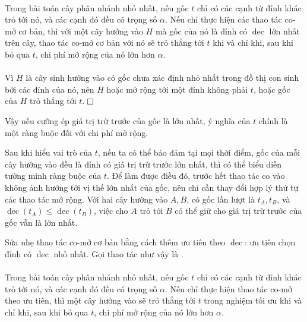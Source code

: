 \documentclass[11pt]{article}
\newcommand{\proofbox}{\ensuremath{\vcenter{\hrule height 0.45pt
  \hbox{\vrule width 0.45pt height 6pt\kern 6pt\vrule width 0.45pt}
  \hrule height 0.45pt}}}
\begin{document}
\paragraph{}
Trong bài toán cây phân nhánh nhỏ nhất, nếu gốc \(t\) chỉ có các cạnh từ đỉnh
khác trỏ tới nó, và các cạnh đó đều có trọng số \(\alpha\). Nếu chỉ thực hiện
các thao tác co-mở cơ bản, thì với một cây hướng vào \(H\) mà gốc của nó là
đỉnh có \(\operatorname{dec}\) lớn nhất trên cây, thao tác co-mở cơ bản với nó
sẽ trỏ thẳng tới \(t\) khi và chỉ khi, sau khi bỏ qua \(t\), chi phí mở rộng
của nó lớn hơn \(\alpha\).

\paragraph{}
Vì \(H\) là cây sinh hướng vào có gốc chưa xác định nhỏ nhất trong đồ thị con
sinh bởi các đỉnh của nó, nên \(H\) hoặc mở rộng tới một đỉnh không phải \(t\),
hoặc gốc của \(H\) trỏ thẳng tới \(t\). \proofbox

Vậy nếu cưỡng ép giá trị trừ trước của gốc là lớn nhất, ý nghĩa của \(t\) chính
là một ràng buộc đối với chi phí mở rộng.

Sau khi hiểu vai trò của \(t\), nếu ta có thể bảo đảm tại mọi thời điểm, gốc của
mỗi cây hướng vào đều là đỉnh có giá trị trừ trước lớn nhất, thì có thể biểu
diễn tường minh ràng buộc của \(t\). Để làm được điều đó, trước hết thao tác co
vào không ảnh hưởng tới vị thế lớn nhất của gốc, nên chỉ cần thay đổi hợp lý
thứ tự các thao tác mở rộng. Với hai cây hướng vào \(A,B\), có gốc lần lượt là
\(t_A,t_B\), và \(\operatorname{dec}(t_A)\le \operatorname{dec}(t_B)\), việc cho
\(A\) trỏ tới \(B\) có thể giữ cho giá trị trừ trước của gốc vẫn là lớn nhất.

Sửa nhẹ thao tác co-mở cơ bản bằng cách thêm ưu tiên theo \(\operatorname{dec}\):
ưu tiên chọn đỉnh có \(\operatorname{dec}\) nhỏ nhất. Gọi thao tác như vậy là
.

\paragraph{}
Trong bài toán cây phân nhánh nhỏ nhất, nếu gốc \(t\) chỉ có các cạnh từ đỉnh
khác trỏ tới nó, và các cạnh đó đều có trọng số \(\alpha\). Nếu chỉ thực hiện
thao tác co-mở theo ưu tiên, thì một cây hướng vào sẽ trỏ thẳng tới \(t\) trong
nghiệm tối ưu khi và chỉ khi, sau khi bỏ qua \(t\), chi phí mở rộng của nó lớn
hơn \(\alpha\).
\end{document}

